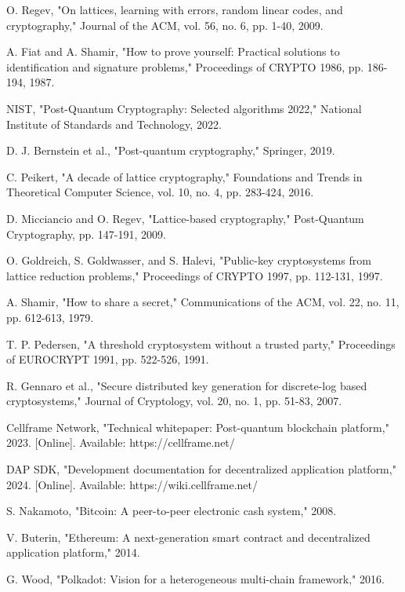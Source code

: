 \documentclass[11pt,a4paper]{article}
\begin{document}
\begin{thebibliography}{99}
O. Regev, "On lattices, learning with errors, random linear codes, and cryptography," Journal of the ACM, vol. 56, no. 6, pp. 1-40, 2009.

A. Fiat and A. Shamir, "How to prove yourself: Practical solutions to identification and signature problems," Proceedings of CRYPTO 1986, pp. 186-194, 1987.

NIST, "Post-Quantum Cryptography: Selected algorithms 2022," National Institute of Standards and Technology, 2022.

D. J. Bernstein et al., "Post-quantum cryptography," Springer, 2019.

C. Peikert, "A decade of lattice cryptography," Foundations and Trends in Theoretical Computer Science, vol. 10, no. 4, pp. 283-424, 2016.

D. Micciancio and O. Regev, "Lattice-based cryptography," Post-Quantum Cryptography, pp. 147-191, 2009.

O. Goldreich, S. Goldwasser, and S. Halevi, "Public-key cryptosystems from lattice reduction problems," Proceedings of CRYPTO 1997, pp. 112-131, 1997.

A. Shamir, "How to share a secret," Communications of the ACM, vol. 22, no. 11, pp. 612-613, 1979.

T. P. Pedersen, "A threshold cryptosystem without a trusted party," Proceedings of EUROCRYPT 1991, pp. 522-526, 1991.

R. Gennaro et al., "Secure distributed key generation for discrete-log based cryptosystems," Journal of Cryptology, vol. 20, no. 1, pp. 51-83, 2007.

Cellframe Network, "Technical whitepaper: Post-quantum blockchain platform," 2023. [Online]. Available: https://cellframe.net/

DAP SDK, "Development documentation for decentralized application platform," 2024. [Online]. Available: https://wiki.cellframe.net/

S. Nakamoto, "Bitcoin: A peer-to-peer electronic cash system," 2008.

V. Buterin, "Ethereum: A next-generation smart contract and decentralized application platform," 2014.

G. Wood, "Polkadot: Vision for a heterogeneous multi-chain framework," 2016.


\end{thebibliography}
\end{document}
